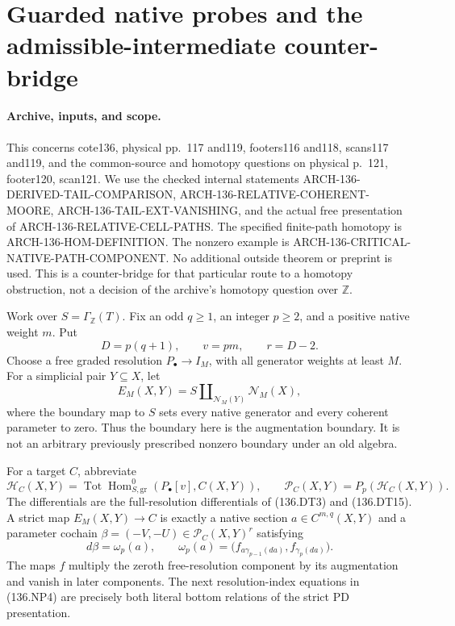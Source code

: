 \section{Guarded native probes and the admissible-intermediate counter-bridge}
\label{sec:136-admissible-native-probes}

\paragraph{Archive, inputs, and scope.}
This concerns cote136, physical pp.~117 and119, footers116
and118, scans117 and119, and the common-source and homotopy
questions on physical p.~121, footer120, scan121.  We use the
checked internal statements ARCH-136-DERIVED-TAIL-COMPARISON,
ARCH-136-RELATIVE-COHERENT-MOORE,
ARCH-136-TAIL-EXT-VANISHING, and the actual free presentation of
ARCH-136-RELATIVE-CELL-PATHS.  The specified finite-path homotopy
is ARCH-136-HOM-DEFINITION.  The nonzero example is
ARCH-136-CRITICAL-NATIVE-PATH-COMPONENT.  No additional outside
theorem or preprint is used.  This is a counter-bridge for that
particular route to a homotopy obstruction, not a decision of
the archive's homotopy question over \(\mathbb Z\).

Work over \(S=\Gamma_{\mathbb Z}(T)\).  Fix an odd
\(q\geq1\), an integer \(p\geq2\), and a positive native
weight \(m\).  Put
\[
               D=p(q+1),\qquad v=pm,\qquad r=D-2.
                                                               \tag{136.NP1}
\]
Choose a free graded resolution \(P_\bullet\to I_M\), with
all generator weights at least \(M\).  For a simplicial pair
\(Y\subseteq X\), let
\[
 E_M(X,Y)=S\amalg_{\mathcal N_M(Y)}\mathcal N_M(X),
                                                               \tag{136.NP2}
\]
where the boundary map to \(S\) sets every native generator
and every coherent parameter to zero.  Thus the boundary here
is the augmentation boundary.  It is not an arbitrary previously
prescribed nonzero boundary under an old algebra.

For a target \(C\), abbreviate
\[
 \mathcal H_C(X,Y)=\operatorname{Tot}
   \operatorname{Hom}^{0}_{S,\mathrm{gr}}
                    (P_\bullet[v],C(X,Y)),\qquad
 \mathcal P_C(X,Y)=P_p(\mathcal H_C(X,Y)).
                                                               \tag{136.NP3}
\]
The differentials are the full-resolution differentials of
(136.DT3) and (136.DT15).  A strict map \(E_M(X,Y)\to C\)
is exactly a native section \(a\in C^{m,q}(X,Y)\) and a
parameter cochain \(\beta=(-V,-U)\in\mathcal P_C(X,Y)^r\)
satisfying
\[
 d\beta=\omega_p(a),\qquad
 \omega_p(a)=\bigl(f_{a\gamma_{p-1}(da)},f_{\gamma_p(da)}\bigr).
                                                               \tag{136.NP4}
\]
The maps \(f\) multiply the zeroth free-resolution component
by its augmentation and vanish in later components.  The next
resolution-index equations in (136.NP4) are precisely both
literal bottom relations of the strict PD presentation.

